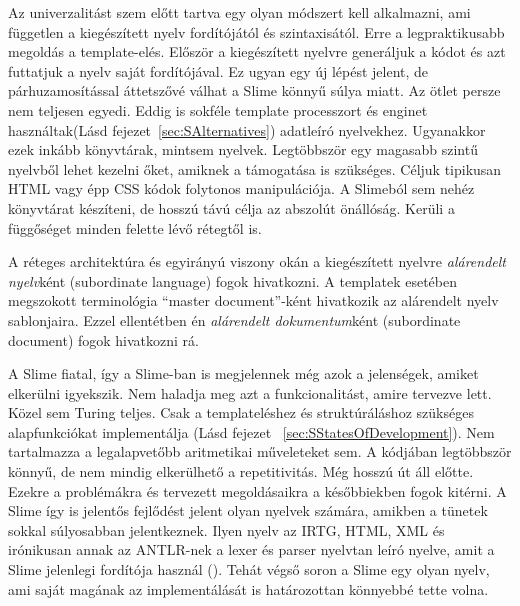 Az univerzalitást szem előtt tartva egy olyan módszert kell alkalmazni, ami független a kiegészített nyelv fordítójától és szintaxisától. 
Erre a legpraktikusabb megoldás a template-elés. 
Először a kiegészített nyelvre generáljuk a kódot és azt futtatjuk a nyelv saját fordítójával. 
Ez ugyan egy új lépést jelent, de párhuzamosítással áttetszővé válhat a Slime könnyű súlya miatt. 
Az ötlet persze nem teljesen egyedi. 
Eddig is sokféle template processzort és enginet használtak(Lásd fejezet~\ref{sec:SAlternatives}) adatleíró nyelvekhez. 
Ugyanakkor ezek inkább könyvtárak, mintsem nyelvek.
Legtöbbször egy magasabb szintű nyelvből lehet kezelni őket, amiknek a támogatása is szükséges. 
Céljuk tipikusan HTML vagy épp CSS kódok folytonos manipulációja. 
A Slimeból sem nehéz könyvtárat készíteni, de hosszú távú célja az abszolút önállóság. 
Kerüli a függőséget minden felette lévő rétegtől is.

A réteges architektúra és egyirányú viszony okán a kiegészített nyelvre \textit{alárendelt nyelv}ként (subordinate language) fogok hivatkozni.
A templatek esetében megszokott terminológia ``master document''-ként hivatkozik az alárendelt nyelv sablonjaira.
Ezzel ellentétben én \textit{alárendelt dokumentum}ként (subordinate document) fogok hivatkozni rá. 

A Slime fiatal, így a Slime-ban is megjelennek még azok a jelenségek, amiket elkerülni igyekszik. 
Nem haladja meg azt a funkcionalitást, amire tervezve lett. 
Közel sem Turing teljes. 
Csak a templateléshez és struktúráláshoz szükséges alapfunkciókat implementálja (Lásd fejezet ~\ref{sec:SStatesOfDevelopment}). 
Nem tartalmazza a legalapvetőbb aritmetikai műveleteket sem. 
A kódjában legtöbbször könnyű, de nem mindig elkerülhető a repetitivitás. 
Még hosszú út áll előtte. 
Ezekre a problémákra és tervezett megoldásaikra a későbbiekben fogok kitérni. 
A Slime így is jelentős fejlődést jelent olyan nyelvek számára, amikben a tünetek sokkal súlyosabban jelentkeznek. 
Ilyen nyelv az IRTG, HTML, XML és irónikusan annak az ANTLR-nek a lexer és parser nyelvtan leíró nyelve, amit a Slime jelenlegi fordítója használ (). 
Tehát végső soron a Slime egy olyan nyelv, ami saját magának az implementálását is határozottan könnyebbé tette volna.


